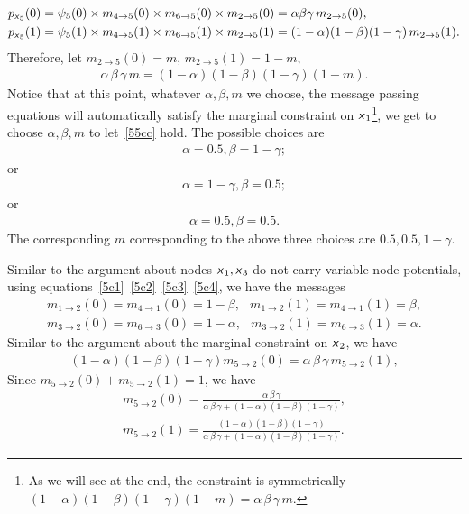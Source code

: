 \documentclass{article}
\newcommand{\s}[1]{\textsf{\textit{#1}}}
\begin{document}
\begin{align*}
	&p_{\s{x}_5}(0) = \psi_5(0) \times m_{4\to 5}(0) \times
					  m_{6\to 5}(0) \times m_{2\to 5}(0)
				   = \alpha\beta\gamma\, m_{2\to 5}(0),\\
	&p_{\s{x}_5}(1) = \psi_5(1) \times m_{4\to 5}(1) \times
					  m_{6\to 5}(1) \times m_{2\to 5}(1)
				   = (1-\alpha)(1-\beta)(1-\gamma)\, m_{2\to 5}(1).
\end{align*}
Therefore, let $m_{2\to5}(0) = m$, $m_{2\to5}(1) = 1 - m$,
\begin{align}
	\alpha\,\beta\,\gamma\,m = (1-\alpha)(1-\beta)(1-\gamma)(1-m). \label{55cc}
\end{align}
%
Notice that at this point, whatever $\alpha, \beta, m$ we choose, the message
passing equations will automatically satisfy the marginal constraint on $\s{x}_1$\footnote{As we will see at the end, the constraint is symmetrically  $(1-\alpha)(1-\beta)(1-\gamma)(1-m) = \alpha\,\beta\,\gamma\,m$.}, we get to choose $\alpha, \beta, m$ to let~\eqref{55cc} hold. The possible choices are
%
\begin{align}
	\alpha = 0.5, \beta = 1-\gamma;	
\end{align}
%
or
%
\begin{align}
	\alpha = 1-\gamma, \beta = 0.5;	
\end{align}
%
or
%
\begin{align}
	\alpha = 0.5, \beta = 0.5.
\end{align}
%
The corresponding $m$ corresponding to the above three choices are $0.5, 0.5, 1-\gamma$.
%

Similar to the argument about nodes $\s{x}_1, \s{x}_3$ do not carry variable node 
potentials, using
equations~\eqref{5c1}~\eqref{5c2}~\eqref{5c3}~\eqref{5c4}, we have the messages
\begin{align}
	m_{1\to 2}(0) = m_{4\to 1}(0) = 1 - \beta,\;\;\,
	m_{1\to 2}(1) = m_{4\to 1}(1) = \beta,\\
	m_{3\to 2}(0) = m_{6\to 3}(0) = 1 - \alpha,\;\;\,
	m_{3\to 2}(1) = m_{6\to 3}(1) = \alpha.
\end{align}
%
Similar to the argument about the marginal constraint on $\s{x}_2$, we have
%
\begin{align}
	(1-\alpha)(1-\beta)(1-\gamma)m_{5\to2}(0) = \alpha\,\beta\,\gamma\,m_{5\to2}(1),
\end{align}
%
Since $m_{5\to2}(0) + m_{5\to2}(1) = 1$, we have
%
\begin{align}
	m_{5\to2}(0) = \frac{\alpha\,\beta\,\gamma}{\alpha\,\beta\,\gamma +
	(1-\alpha)(1-\beta)(1-\gamma)},\\
	m_{5\to2}(1) = \frac{(1-\alpha)(1-\beta)(1-\gamma)
	}{\alpha\,\beta\,\gamma +
	(1-\alpha)(1-\beta)(1-\gamma)}.
\end{align}
\end{document}
